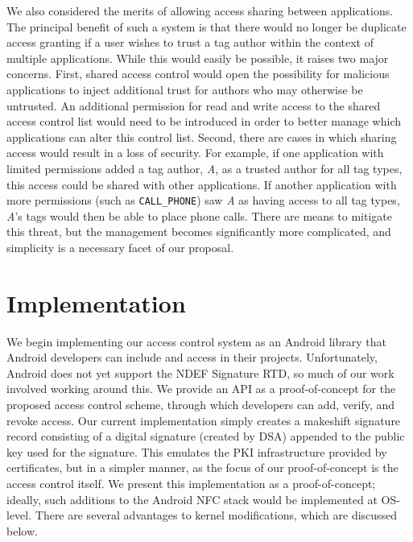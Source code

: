 \documentclass[12pt]{article}
\begin{document}
We also considered the merits of allowing access sharing between applications.
The principal benefit of such a system is that there would no longer be duplicate access granting if a user wishes to trust a tag author within the context of multiple applications.
While this would easily be possible, it raises two major concerns.
First, shared access control would open the possibility for malicious applications to inject additional trust for authors who may otherwise be untrusted.
An additional permission for read and write access to the shared access control list would need to be introduced in order to better manage which applications can alter this control list.
Second, there are cases in which sharing access would result in a loss of security.
For example, if one application with limited permissions added a tag author, \textit{A}, as a trusted author for all tag types, this access could be shared with other applications.
If another application with more permissions (such as \texttt{CALL\_PHONE}) saw \textit{A} as having access to all tag types, \textit{A}'s tags would then be able to place phone calls.
There are means to mitigate this threat, but the management becomes significantly more complicated, and simplicity is a necessary facet of our proposal.

\section{Implementation}
We begin implementing our access control system as an Android library that Android developers can include and access in their projects.
Unfortunately, Android does not yet support the NDEF Signature RTD, so much of our work involved working around this.
We provide an API as a proof-of-concept for the proposed access control scheme, through which developers can add, verify, and revoke access.
Our current implementation simply creates a makeshift signature record consisting of a digital signature (created by DSA) appended to the public key used for the signature.
This emulates the PKI infrastructure provided by certificates, but in a simpler manner, as the focus of our proof-of-concept is the access control itself.
We present this implementation as a proof-of-concept; ideally, such additions to the Android NFC stack would be implemented at OS-level.
There are several advantages to kernel modifications, which are discussed below.
\end{document}
